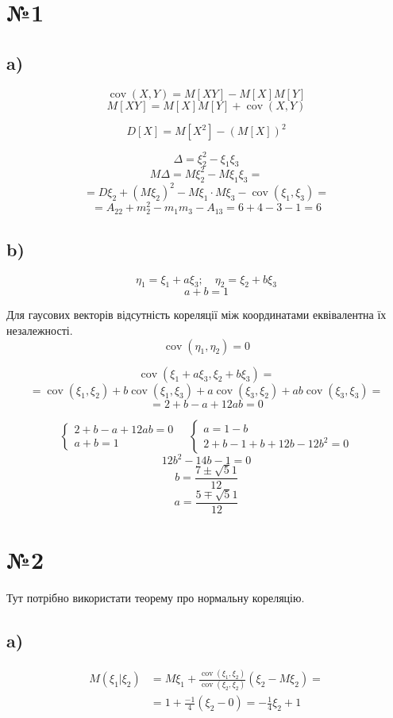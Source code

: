 \documentclass[11pt, a4paper]{article} %
\DeclareMathOperator{\cov}{cov}
\begin{document}
\section*{№1}

\subsection*{a)}
$$\cov(X, Y) = M[XY] - M[X]M[Y]$$
$$M[XY] = M[X]M[Y] + \cov(X, Y)$$

$$D[X] = M[X^2] - (M[X])^2$$

$$\Delta = \xi_2^2 - \xi_1\xi_3$$
$$M\Delta = M\xi_2^2 - M\xi_1\xi_3 = $$
$$= D\xi_2 + \left(M\xi_2\right)^2 - M\xi_1 \cdot M\xi_3 - \cov(\xi_1,\xi_3) = $$
$$= A_{22} + m_2^2 - m_1m_3 - A_{13} = 6 + 4 - 3 - 1 = 6$$

\subsection*{b)}
$$\eta_1 = \xi_1 + a\xi_3;\quad \eta_2 = \xi_2 + b \xi_3$$
$$a+b = 1$$

Для гаусових векторів відсутність кореляції між координатами еквівалентна їх незалежності.
$$\cov(\eta_1, \eta_2) = 0$$

$$\cov(\xi_1 + a\xi_3, \xi_2 + b\xi_3) = $$
$$= \cov(\xi_1, \xi_2) + b \cov(\xi_1, \xi_3) + a \cov(\xi_3, \xi_2) + ab\cov(\xi_3, \xi_3) = $$
$$= 2 + b - a + 12 ab = 0$$

$$\begin{cases}
    2 + b - a + 12 ab = 0 \\
    a + b = 1
\end{cases} \quad 
\begin{cases}
    a = 1 - b \\
    2 + b - 1 + b + 12 b - 12 b^2 = 0
\end{cases}$$
$$12b^2 - 14b - 1 = 0$$
$$b = \frac{7 \pm \sqrt 51}{12}$$
$$a = \frac{5 \mp \sqrt 51}{12}$$
\pagebreak

\section*{№2}

Тут потрібно використати теорему про нормальну кореляцію.
\subsection*{a)}

\begin{align*}
    M(\xi_1 | \xi_2) &= M\xi_1 + \frac{\cov(\xi_1, \xi_2)}{\cov(\xi_2, \xi_2)}(\xi_2 - M\xi_2) = \\
    &= 1 + \frac{-1}{4}(\xi_2 - 0) = -\frac{1}{4}\xi_2 + 1
\end{align*}
\end{document}
